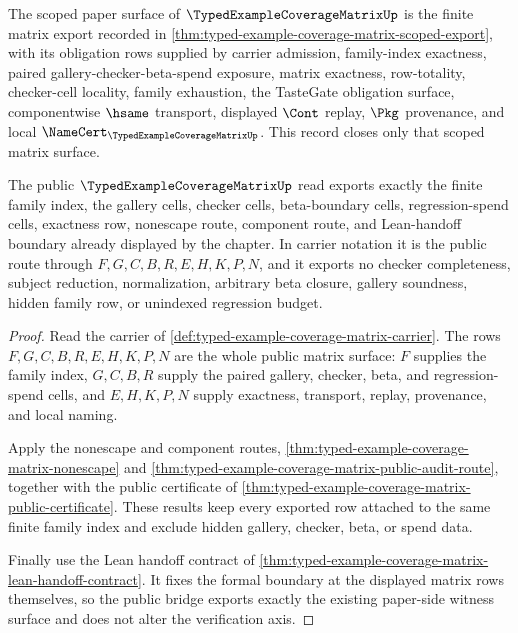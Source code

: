 
\begin{theorem}
\label{thm:typed-example-coverage-matrix-scope-closure-record}
The scoped paper surface of $\TypedExampleCoverageMatrixUp$ is the finite matrix export recorded in \autoref{thm:typed-example-coverage-matrix-scoped-export}, with its obligation rows supplied by carrier admission, family-index exactness, paired gallery-checker-beta-spend exposure, matrix exactness, row-totality, checker-cell locality, family exhaustion, the TasteGate obligation surface, componentwise $\hsame$ transport, displayed $\Cont$ replay, $\Pkg$ provenance, and local $\NameCert_{\TypedExampleCoverageMatrixUp}$. This record closes only that scoped matrix surface.
\end{theorem}

\begin{theorem}
\label{thm:typed-example-coverage-matrix-public-bridge}
The public $\TypedExampleCoverageMatrixUp$ read exports exactly the finite family index, the gallery cells, checker cells, beta-boundary cells, regression-spend cells, exactness row, nonescape route, component route, and Lean-handoff boundary already displayed by the chapter. In carrier notation it is the public route through $F,G,C,B,R,E,H,K,P,N$, and it exports no checker completeness, subject reduction, normalization, arbitrary beta closure, gallery soundness, hidden family row, or unindexed regression budget.
\end{theorem}
\begin{proof}
Read the carrier of \autoref{def:typed-example-coverage-matrix-carrier}. The rows $F,G,C,B,R,E,H,K,P,N$ are the whole public matrix surface: $F$ supplies the family index, $G,C,B,R$ supply the paired gallery, checker, beta, and regression-spend cells, and $E,H,K,P,N$ supply exactness, transport, replay, provenance, and local naming.

Apply the nonescape and component routes, \autoref{thm:typed-example-coverage-matrix-nonescape} and \autoref{thm:typed-example-coverage-matrix-public-audit-route}, together with the public certificate of \autoref{thm:typed-example-coverage-matrix-public-certificate}. These results keep every exported row attached to the same finite family index and exclude hidden gallery, checker, beta, or spend data.

Finally use the Lean handoff contract of \autoref{thm:typed-example-coverage-matrix-lean-handoff-contract}. It fixes the formal boundary at the displayed matrix rows themselves, so the public bridge exports exactly the existing paper-side witness surface and does not alter the verification axis.
\end{proof}

